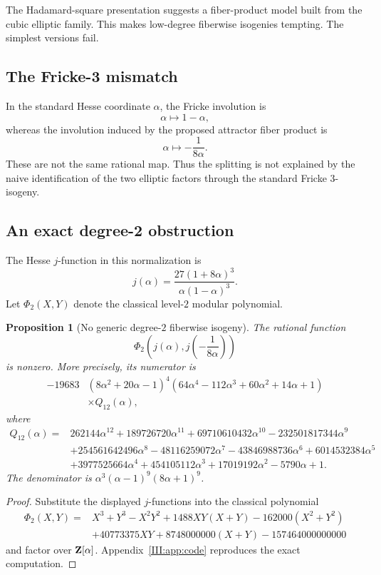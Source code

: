 \documentclass[11pt,letterpaper]{article}
\newtheorem{proposition}[theorem]{Proposition}
\theoremstyle{definition}
\theoremstyle{remark}
\begin{document}
The Hadamard-square presentation suggests a fiber-product model built from the cubic elliptic family.
This makes low-degree fiberwise isogenies tempting.  The simplest versions fail.

\subsection{The Fricke-3 mismatch}
In the standard Hesse coordinate $\alpha$, the Fricke involution is
\[
 \alpha\longmapsto1-\alpha,
\]
whereas the involution induced by the proposed attractor fiber product is
\[
 \alpha\longmapsto-\frac1{8\alpha}.
\]
These are not the same rational map.  Thus the splitting is not explained by the naive identification of
the two elliptic factors through the standard Fricke $3$-isogeny.

\subsection{An exact degree-2 obstruction}
The Hesse $j$-function in this normalization is
\[
 j(\alpha)=\frac{27(1+8\alpha)^3}{\alpha(1-\alpha)^3}.
\]
Let $\Phi_2(X,Y)$ denote the classical level-$2$ modular polynomial.

\begin{proposition}[No generic degree-$2$ fiberwise isogeny]\label{III:prop:phi2}
The rational function
\[
 \Phi_2\!\left(j(\alpha),j\!\left(-\frac1{8\alpha}\right)\right)
\]
is nonzero.  More precisely, its numerator is
\[
\begin{split}
-19683&(8\alpha^2+20\alpha-1)^4
(64\alpha^4-112\alpha^3+60\alpha^2+14\alpha+1)\\
&\times Q_{12}(\alpha),
\end{split}
\]
where
\[
\begin{split}
Q_{12}(\alpha)={}&262144\alpha^{12}+189726720\alpha^{11}+69710610432\alpha^{10}
-232501817344\alpha^9\\
&+254561642496\alpha^8-48116259072\alpha^7-43846988736\alpha^6
+6014532384\alpha^5\\
&+3977525664\alpha^4+454105112\alpha^3+17019192\alpha^2-5790\alpha+1.
\end{split}
\]
The denominator is $\alpha^3(\alpha-1)^9(8\alpha+1)^9$.
\end{proposition}

\begin{proof}
Substitute the displayed $j$-functions into the classical polynomial
\[
\begin{split}
\Phi_2(X,Y)={}&X^3+Y^3-X^2Y^2+1488XY(X+Y)-162000(X^2+Y^2)\\
&+40773375XY+8748000000(X+Y)-157464000000000
\end{split}
\]
and factor over $\mathbf Z[\alpha]$.  Appendix~\ref{III:app:code} reproduces the exact computation.
\end{proof}
\end{document}

